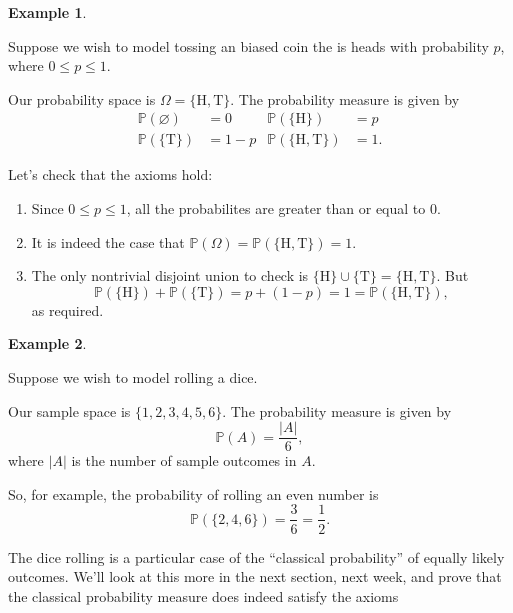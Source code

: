 \documentclass[
  a4paper,
]{book}
\providecommand{\tightlist}{%
  \setlength{\itemsep}{0pt}\setlength{\parskip}{0pt}}
\theoremstyle{definition}
\theoremstyle{definition}
\newtheorem{example}{Example}[chapter]
\theoremstyle{definition}
\theoremstyle{remark}
\begin{document}
\begin{example}
\protect\hypertarget{exm:unlabeled-div-10}{}\label{exm:unlabeled-div-10}

Suppose we wish to model tossing an biased coin the is heads with probability \(p\), where \(0 \leq p \leq 1\).

Our probability space is \(\Omega = \{\text{H}, \text{T}\}\). The probability measure is given by
\begin{align*}
   \mathbb P(\varnothing) &= 0  &  \mathbb P(\{\text{H}\}) &= p \\
   \mathbb P(\{\text{T}\}) &= 1 - p  &  \mathbb P(\{\text{H},\text{T}\})  &= 1 .
\end{align*}

Let's check that the axioms hold:

\begin{enumerate}
\def\labelenumi{\arabic{enumi}.}
\tightlist
\item
  Since \(0 \leq p \leq 1\), all the probabilites are greater than or equal to 0.
\item
  It is indeed the case that \(\mathbb P(\Omega) = \mathbb P(\{\text{H},\text{T}\}) = 1\).
\item
  The only nontrivial disjoint union to check is \(\{\text{H}\} \cup \{\text{T}\} = \{\text{H},\text{T}\}\). But
  \[ \mathbb P(\{\text{H}\}) + \mathbb P(\{\text{T}\}) = p + (1 - p) = 1 = \mathbb P(\{\text{H},\text{T}\}) , \]
  as required.
\end{enumerate}

\end{example}

\begin{example}
\protect\hypertarget{exm:unlabeled-div-11}{}\label{exm:unlabeled-div-11}

Suppose we wish to model rolling a dice.

Our sample space is \(\{1,2,3,4,5,6\}\). The probability measure is given by
\[ \mathbb P(A) = \frac{|A|}{6} , \]
where \(|A|\) is the number of sample outcomes in \(A\).

So, for example, the probability of rolling an even number is
\[ \mathbb P(\{2,4,6\}) = \frac36 = \frac12 . \]

\end{example}

The dice rolling is a particular case of the ``classical probability'' of equally likely outcomes. We'll look at this more in the next section, next week, and prove that the classical probability measure does indeed satisfy the axioms
\end{document}
